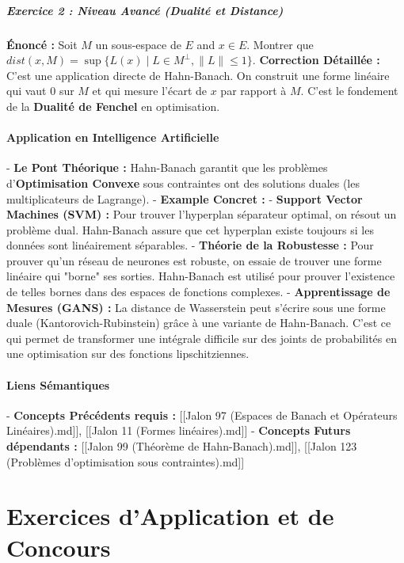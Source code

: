 \documentclass[11pt,a4paper]{article}
\begin{document}
\subsubsection{Exercice 2 : Niveau Avancé (Dualité et Distance)}
\textbf{Énoncé :} Soit $M$ un sous-espace de $E$ and $x \in E$. Montrer que $dist(x, M) = \sup \{ L(x) \mid L \in M^\perp, \|L\| \le 1 \}$.
\textbf{Correction Détaillée :}
C'est une application directe de Hahn-Banach. On construit une forme linéaire qui vaut 0 sur $M$ et qui mesure l'écart de $x$ par rapport à $M$. C'est le fondement de la \textbf{Dualité de Fenchel} en optimisation.

\subsection{Application en Intelligence Artificielle}

- \textbf{Le Pont Théorique :} Hahn-Banach garantit que les problèmes d'\textbf{Optimisation Convexe} sous contraintes ont des solutions duales (les multiplicateurs de Lagrange).
- \textbf{Example Concret :}
    - \textbf{Support Vector Machines (SVM) :} Pour trouver l'hyperplan séparateur optimal, on résout un problème dual. Hahn-Banach assure que cet hyperplan existe toujours si les données sont linéairement séparables.
    - \textbf{Théorie de la Robustesse :} Pour prouver qu'un réseau de neurones est robuste, on essaie de trouver une forme linéaire qui "borne" ses sorties. Hahn-Banach est utilisé pour prouver l'existence de telles bornes dans des espaces de fonctions complexes.
    - \textbf{Apprentissage de Mesures (GANS) :} La distance de Wasserstein peut s'écrire sous une forme duale (Kantorovich-Rubinstein) grâce à une variante de Hahn-Banach. C'est ce qui permet de transformer une intégrale difficile sur des joints de probabilités en une optimisation sur des fonctions lipschitziennes.

\subsection{Liens Sémantiques}

- \textbf{Concepts Précédents requis :} [[Jalon 97 (Espaces de Banach et Opérateurs Linéaires).md]], [[Jalon 11 (Formes linéaires).md]]
- \textbf{Concepts Futurs dépendants :} [[Jalon 99 (Théorème de Hahn-Banach).md]], [[Jalon 123 (Problèmes d'optimisation sous contraintes).md]]


\part{Exercices d'Application et de Concours}
\end{document}
